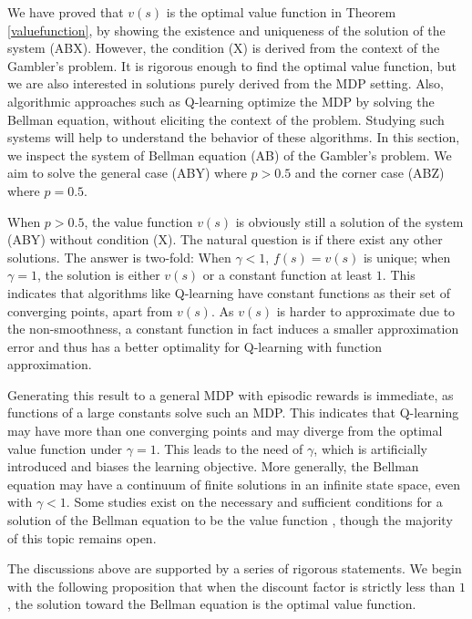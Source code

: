 \documentclass{article}
\theoremstyle{named}
\begin{document}
We have proved that $v(s)$ is the optimal value function in Theorem \ref{valuefunction}, by showing the existence and uniqueness of the solution of the system ({ABX}). However, the condition ({X}) is derived from the context of the Gambler's problem.
It is rigorous enough to find the optimal value function, but we are also interested in solutions purely derived from the MDP setting.
Also, algorithmic approaches such as Q-learning \citep{watkins1992q,baird1995residual,mnih2015human} optimize the MDP by solving the Bellman equation, without eliciting the context of the problem. 
Studying such systems will help to understand the behavior of these algorithms.
In this section, we inspect the system of Bellman equation ({AB}) of the Gambler's problem. 
We aim to solve the general case ({ABY}) where $p>0.5$ and the corner case ({ABZ}) where $p=0.5$.


When $p>0.5$, the value function $v(s)$ is obviously still a solution of the system ({ABY}) without condition ({X}). The natural question is if there exist any other solutions. The answer is two-fold: When $\gamma<1$, $f(s)=v(s)$ is unique; when $\gamma=1$, the solution is either $v(s)$ or a constant function at least $1$. This indicates that algorithms like Q-learning have constant functions as their set of converging points, apart from $v(s)$. As $v(s)$ is harder to approximate due to the non-smoothness, a constant function in fact induces a smaller approximation error and thus has a better optimality for Q-learning with function approximation.

Generating this result to a general MDP with episodic rewards is immediate, as functions of a large constants solve such an MDP. This indicates that Q-learning may have more than one converging points and may diverge from the optimal value function under $\gamma=1$. This leads to the need of $\gamma$, which is artificially introduced and biases the learning objective. More generally, the Bellman equation may have a continuum of finite solutions in an infinite state space, even with $\gamma<1$. Some studies exist on the necessary and sufficient conditions for a solution of the Bellman equation to be the value function \citep{kamihigashi2015necessary,bellman2008latham,harmon1996spurious}, though the majority of this topic remains open.

The discussions above are supported by a series of rigorous statements. We begin with the following proposition that when the discount factor is strictly less than $1$, the solution toward the Bellman equation is the optimal value function.
\end{document}
